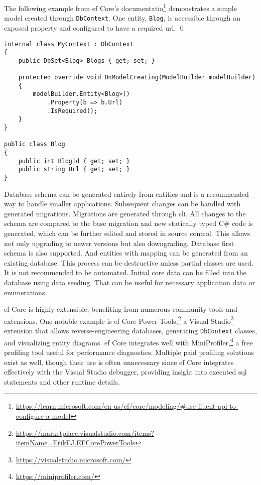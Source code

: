 \begin{example}
\small
The following example from \acrshort{ef} Core's documentatio\footnote{\url{https://learn.microsoft.com/en-us/ef/core/modeling/\#use-fluent-api-to-configure-a-model}} demonstrates a simple model created through \texttt{DbContext}. One entity, \texttt{Blog}, is accessible through an exposed property and configured to have a required \acrshort{url}.
\qed

\begin{lstlisting}[language=CSharp]
internal class MyContext : DbContext
{
    public DbSet<Blog> Blogs { get; set; }

    protected override void OnModelCreating(ModelBuilder modelBuilder)
    {
        modelBuilder.Entity<Blog>()
            .Property(b => b.Url)
            .IsRequired();
    }
}

public class Blog
{
    public int BlogId { get; set; }
    public string Url { get; set; }
}
\end{lstlisting}
\end{example}

Database schema can be generated entirely from entities and is a recommended way to handle smaller applications. Subsequent changes can be handled with generated migrations. Migrations are generated through \acrshort{cli}. All changes to the schema are compared to the base migration and new statically typed C\# code is generated, which can be further edited and stored in source control. This allows not only upgrading to newer versions but also downgrading. Database first schema is also supported. And entities with mapping can be generated from an existing database. This process can be destructive unless partial classes are used. It is not recommended to be automated. Initial core data can be filled into the database using data seeding. That can be useful for necessary application data or enumerations.

\acrshort{ef} Core is highly extensible, benefiting from numerous community tools and extensions. One notable example is \acrshort{ef} Core Power Tools,\footnote{\url{https://marketplace.visualstudio.com/items?itemName=ErikEJ.EFCorePowerTools}} a Visual Studio\footnote{\url{https://visualstudio.microsoft.com/}} extension that allows reverse-engineering databases, generating \texttt{DbContext} classes, and visualizing entity diagrams. \acrshort{ef} Core integrates well with MiniProfiler,\footnote{\url{https://miniprofiler.com/}} a free profiling tool useful for performance diagnostics. Multiple paid profiling solutions exist as well, though their use is often unnecessary since \acrshort{ef} Core integrates effectively with the Visual Studio debugger, providing insight into executed \acrshort{sql} statements and other runtime details.


